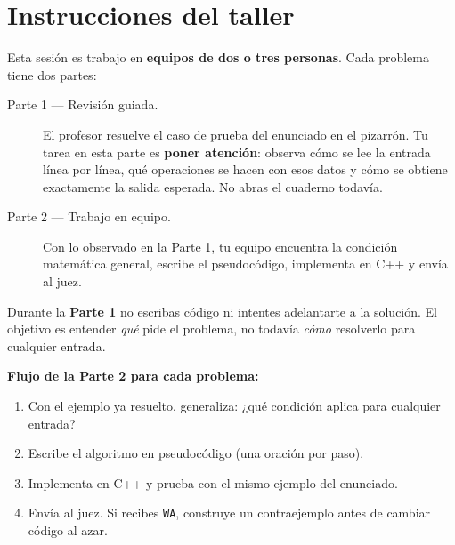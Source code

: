\documentclass[12pt, oneside]{article}
\begin{document}
\section{Instrucciones del taller}

Esta sesión es trabajo en \textbf{equipos de dos o tres personas}.
Cada problema tiene dos partes:

\begin{description}
  \item[Parte 1 — Revisión guiada.]
    El profesor resuelve el caso de prueba del enunciado en el pizarrón.
    Tu tarea en esta parte es \textbf{poner atención}: observa cómo se
    lee la entrada línea por línea, qué operaciones se hacen con esos
    datos y cómo se obtiene exactamente la salida esperada.
    No abras el cuaderno todavía.

  \item[Parte 2 — Trabajo en equipo.]
    Con lo observado en la Parte 1, tu equipo encuentra la condición
    matemática general, escribe el pseudocódigo, implementa en C++ y
    envía al juez.
\end{description}

\begin{advertencia}
  Durante la \textbf{Parte 1} no escribas código ni intentes adelantarte
  a la solución.  El objetivo es entender \emph{qué} pide el problema,
  no todavía \emph{cómo} resolverlo para cualquier entrada.
\end{advertencia}

\begin{consejo}
  \textbf{Flujo de la Parte 2 para cada problema:}
  \begin{enumerate}
    \item Con el ejemplo ya resuelto, generaliza: ¿qué condición aplica
          para cualquier entrada?
    \item Escribe el algoritmo en pseudocódigo (una oración por paso).
    \item Implementa en C++ y prueba con el mismo ejemplo del enunciado.
    \item Envía al juez.  Si recibes \texttt{WA}, construye un
          contraejemplo antes de cambiar código al azar.
  \end{enumerate}
\end{consejo}

\newpage
\end{document}
